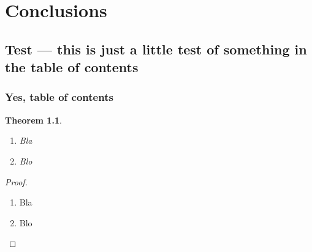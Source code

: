 \documentclass[twoside,11pt]{ctuthesis}
\theoremstyle{plain}
\newtheorem{theorem}{Theorem}[chapter]
\theoremstyle{definition}
\theoremstyle{note}
\begin{document}
\chapter{Conclusions}

\section{Test --- this is just a little test of something in the table of contents}

\subsection{Yes, table of contents}

\begin{theorem}\begin{enumerate} \item Bla \item Blo \end{enumerate} \end{theorem}

\medskip

\begin{proof}\begin{enumerate} \item Bla \item Blo \end{enumerate} \end{proof}

\appendix

\printindex




\end{document}
